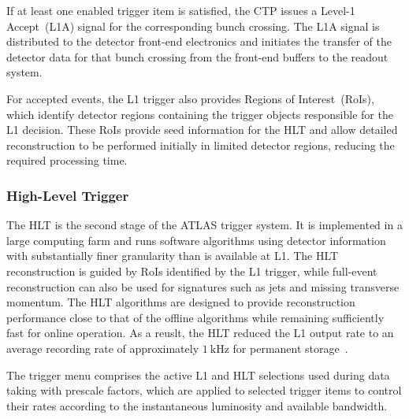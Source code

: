 If at least one enabled trigger item is satisfied, the CTP issues a Level-1 Accept~(L1A) signal for the corresponding bunch crossing.
The L1A signal is distributed to the detector front-end electronics and initiates the transfer of the detector data for that bunch crossing from the front-end buffers to the readout system.

For accepted events, the L1 trigger also provides Regions of Interest~(RoIs), which identify detector regions containing the trigger objects responsible for the L1 decision.
These RoIs provide seed information for the HLT and allow detailed reconstruction to be performed initially in limited detector regions, reducing the required processing time.

\subsubsection*{High-Level Trigger}

The HLT is the second stage of the ATLAS trigger system.
It is implemented in a large computing farm and runs software algorithms using detector information with substantially finer granularity than is available at L1.
The HLT reconstruction is guided by RoIs identified by the L1 trigger, while full-event reconstruction can also be used for signatures such as jets and missing transverse momentum.
The HLT algorithms are designed to provide reconstruction performance close to that of the offline algorithms while remaining sufficiently fast for online operation.
As a reuslt, the HLT reduced the L1 output rate to an average recording rate of approximately $1~\mathrm{kHz}$ for permanent storage~\cite{ATLASTriggerRun2}.

The trigger menu comprises the active L1 and HLT selections used during data taking with prescale factors, which are applied to selected trigger items to control their rates according to the instantaneous luminosity and available bandwidth.
